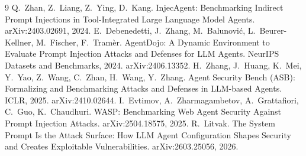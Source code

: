 \documentclass[11pt]{article}
\begin{document}
\begin{thebibliography}{9}
 Q.~Zhan, Z.~Liang, Z.~Ying, D.~Kang. InjecAgent: Benchmarking Indirect Prompt Injections in Tool-Integrated Large Language Model Agents. arXiv:2403.02691, 2024.
 E.~Debenedetti, J.~Zhang, M.~Balunovi\'c, L.~Beurer-Kellner, M.~Fischer, F.~Tram\`er. AgentDojo: A Dynamic Environment to Evaluate Prompt Injection Attacks and Defenses for LLM Agents. NeurIPS Datasets and Benchmarks, 2024. arXiv:2406.13352.
 H.~Zhang, J.~Huang, K.~Mei, Y.~Yao, Z.~Wang, C.~Zhan, H.~Wang, Y.~Zhang. Agent Security Bench (ASB): Formalizing and Benchmarking Attacks and Defenses in LLM-based Agents. ICLR, 2025. arXiv:2410.02644.
 I.~Evtimov, A.~Zharmagambetov, A.~Grattafiori, C.~Guo, K.~Chaudhuri. WASP: Benchmarking Web Agent Security Against Prompt Injection Attacks. arXiv:2504.18575, 2025.
 R.~Litvak. The System Prompt Is the Attack Surface: How LLM Agent Configuration Shapes Security and Creates Exploitable Vulnerabilities. arXiv:2603.25056, 2026.
\end{thebibliography}
\end{document}
